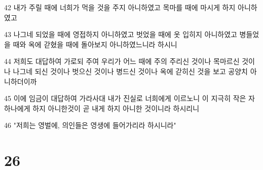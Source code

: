 \par 42 내가 주릴 때에 너희가 먹을 것을 주지 아니하였고 목마를 때에 마시게 하지 아니하였고
\par 43 나그네 되었을 때에 영접하지 아니하였고 벗었을 때에 옷 입히지 아니하였고 병들었을 때와 옥에 갇혔을 때에 돌아보지 아니하였느니라 하시니
\par 44 저희도 대답하여 가로되 주여 우리가 어느 때에 주의 주리신 것이나 목마르신 것이나 나그네 되신 것이나 벗으신 것이나 병드신 것이나 옥에 갇히신 것을 보고 공양치 아니하더이까
\par 45 이에 임금이 대답하여 가라사대 내가 진실로 너희에게 이르노니 이 지극히 작은 자 하나에게 하지 아니한것이 곧 내게 하지 아니한 것이니라 하시리니
\par 46 "저희는 영벌에, 의인들은 영생에 들어가리라 하시니라"

\chapter{26}

